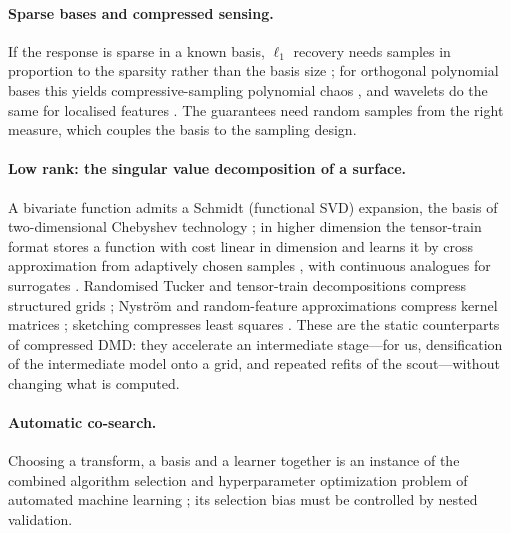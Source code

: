 \paragraph{Sparse bases and compressed sensing.} If the response is sparse in a known basis, $\ell_1$ recovery needs
samples in proportion to the sparsity rather than the basis size \cite{candes2006robust,donoho2006compressed}; for
orthogonal polynomial bases this yields compressive-sampling polynomial chaos
\cite{rauhut2012sparse,doostan2011non,hampton2015compressive}, and wavelets do the same for localised features
\cite{donoho1994ideal}. The guarantees need random samples from the right measure, which couples the basis to the
sampling design.

\paragraph{Low rank: the singular value decomposition of a surface.} A bivariate function admits a Schmidt (functional
SVD) expansion, the basis of two-dimensional Chebyshev technology \cite{townsend2013extension}; in higher dimension the
tensor-train format stores a function with cost linear in dimension and learns it by cross approximation from adaptively
chosen samples \cite{oseledets2011tensor,oseledets2010tt}, with continuous analogues for surrogates
\cite{gorodetsky2019continuous}. Randomised Tucker and tensor-train decompositions compress structured grids
\cite{minster2020randomized}; Nystr\"om and random-feature approximations compress kernel matrices
\cite{williams2001using,rahimi2007random}; sketching compresses least squares \cite{woodruff2014sketching}. These are the
static counterparts of compressed DMD: they accelerate an intermediate stage---for us, densification of the
intermediate model onto a grid, and repeated refits of the scout---without changing what is computed.

\paragraph{Automatic co-search.} Choosing a transform, a basis and a learner together is an instance of the combined
algorithm selection and hyperparameter optimization problem of automated machine learning
\cite{thornton2013auto,feurer2015efficient}; its selection bias must be controlled by nested validation.
